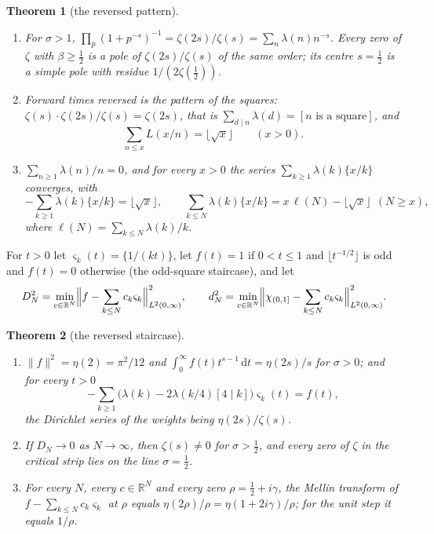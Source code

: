 \documentclass[11pt]{article}
\newtheorem{theorem}{Theorem}[section]
\theoremstyle{definition}\newtheorem{definition}[theorem]{Definition}
\theoremstyle{remark}\newtheorem{remark}[theorem]{Remark}
\theoremstyle{definition}\newtheorem{axiom}{Axiom}
\newcommand{\R}{\mathbb R}\newcommand{\C}{\mathbb C}\newcommand{\N}{\mathbb N}\newcommand{\Z}{\mathbb Z}
\newcommand{\dd}{\,\mathrm d}\newcommand{\e}{\mathrm e}
\newcommand{\fr}[1]{\{#1\}}
\begin{document}
\begin{theorem}[the reversed pattern]\label{mt:reverse}
\begin{enumerate}[label=\textup{(\roman*)}]
\item For $\sigma>1$, $\prod_p(1+p^{-s})^{-1}=\zeta(2s)/\zeta(s)=\sum_n\lambda(n)n^{-s}$. Every zero of $\zeta$ with $\beta\ge\frac12$ is a pole of $\zeta(2s)/\zeta(s)$ of the same order; its centre $s=\frac12$ is a simple pole with residue $1/(2\zeta(\frac12))$.
\item Forward times reversed is the pattern of the squares: $\zeta(s)\cdot\zeta(2s)/\zeta(s)=\zeta(2s)$, that is $\sum_{d\mid n}\lambda(d)=[n\text{ is a square}]$, and
\begin{equation}\label{eq:revrebuild}
\sum_{n\le x}L(x/n)=\lfloor\sqrt x\rfloor\qquad(x>0).
\end{equation}
\item $\sum_{n\ge1}\lambda(n)/n=0$, and for every $x>0$ the series $\sum_{k\ge1}\lambda(k)\fr{x/k}$ converges, with
\begin{equation}\label{eq:revsaw}
-\sum_{k\ge1}\lambda(k)\fr{x/k}=\lfloor\sqrt x\rfloor,\qquad \sum_{k\le N}\lambda(k)\fr{x/k}=x\,\ell(N)-\lfloor\sqrt x\rfloor\ \ (N\ge x),
\end{equation}
where $\ell(N)=\sum_{k\le N}\lambda(k)/k$.
\end{enumerate}
\end{theorem}

For $t>0$ let $\varsigma_k(t)=\fr{1/(kt)}$, let $f(t)=1$ if $0<t\le1$ and $\lfloor t^{-1/2}\rfloor$ is odd and $f(t)=0$ otherwise (the odd-square staircase), and let
\[
D_N^2=\min_{c\in\R^N}\Bigl\|f-\sum_{k\le N}c_k\varsigma_k\Bigr\|^2_{L^2(0,\infty)},\qquad d_N^2=\min_{c\in\R^N}\Bigl\|\chi_{(0,1]}-\sum_{k\le N}c_k\varsigma_k\Bigr\|^2_{L^2(0,\infty)}.
\]

\begin{theorem}[the reversed staircase]\label{mt:revNB}
\begin{enumerate}[label=\textup{(\roman*)}]
\item $\|f\|^2=\eta(2)=\pi^2/12$ and $\int_0^\infty f(t)t^{s-1}\dd t=\eta(2s)/s$ for $\sigma>0$; and for every $t>0$
\[
-\sum_{k\ge1}\bigl(\lambda(k)-2\lambda(k/4)[4\mid k]\bigr)\varsigma_k(t)=f(t),
\]
the Dirichlet series of the weights being $\eta(2s)/\zeta(s)$.
\item If $D_N\to0$ as $N\to\infty$, then $\zeta(s)\ne0$ for $\sigma>\frac12$, and every zero of $\zeta$ in the critical strip lies on the line $\sigma=\frac12$.
\item For every $N$, every $c\in\R^N$ and every zero $\rho=\frac12+i\gamma$, the Mellin transform of $f-\sum_{k\le N}c_k\varsigma_k$ at $\rho$ equals $\eta(2\rho)/\rho=\eta(1+2i\gamma)/\rho$; for the unit step it equals $1/\rho$.
\end{enumerate}
\end{theorem}
\end{document}

